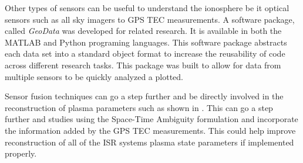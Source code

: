 Other types of sensors can be useful to understand the ionosphere be it optical sensors such as all sky imagers to GPS TEC measurements. A software package, called \textit{GeoData} was developed for related research. It is available in both the MATLAB \cite{john_swoboda_2016_154536} 
and Python \cite{Swobodaetal2016} programing languages. This software package abstracts each data set into a standard object format to increase the reusability of code across different research tasks. This package was built to allow for data from multiple sensors to be quickly analyzed a plotted. 

Sensor fusion techniques can go a step further and be directly involved in the reconstruction of plasma parameters such as shown in \cite{Semeter:2016gm}. This can go a step further and studies using the Space-Time Ambiguity formulation and incorporate the information added by the GPS TEC measurements. This could help improve reconstruction of all of the ISR systems plasma state parameters if implemented properly.
